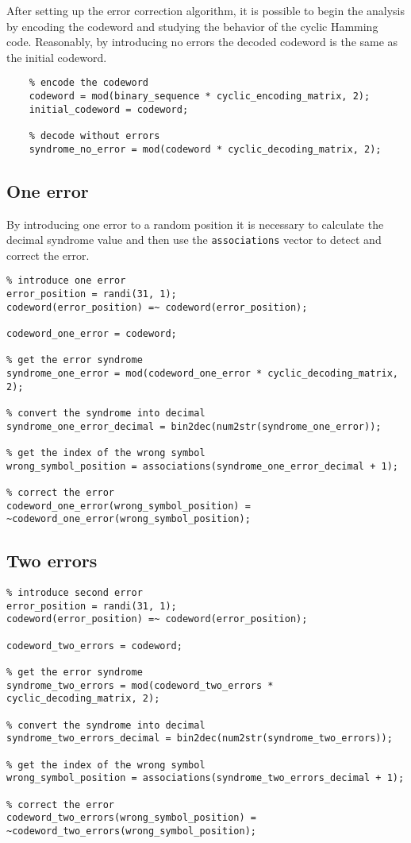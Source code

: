 \noindent After setting up the error correction algorithm, it is possible to begin the analysis by encoding the codeword and studying the behavior of the cyclic Hamming code. Reasonably, by introducing no errors the decoded codeword is the same as the initial codeword.

\begin{lstlisting} 
    % encode the codeword
    codeword = mod(binary_sequence * cyclic_encoding_matrix, 2);
    initial_codeword = codeword;
    
    % decode without errors
    syndrome_no_error = mod(codeword * cyclic_decoding_matrix, 2);
\end{lstlisting}


\subsection{One error}
By introducing one error to a random position it is necessary to calculate the decimal syndrome value and then use the \texttt{associations} vector to detect and correct the error.

\begin{lstlisting}
% introduce one error
error_position = randi(31, 1);
codeword(error_position) =~ codeword(error_position);

codeword_one_error = codeword;

% get the error syndrome
syndrome_one_error = mod(codeword_one_error * cyclic_decoding_matrix, 2);

% convert the syndrome into decimal
syndrome_one_error_decimal = bin2dec(num2str(syndrome_one_error));

% get the index of the wrong symbol
wrong_symbol_position = associations(syndrome_one_error_decimal + 1);

% correct the error
codeword_one_error(wrong_symbol_position) = ~codeword_one_error(wrong_symbol_position);
\end{lstlisting}


\subsection{Two errors} \label{two-errors-correction}

\begin{lstlisting}
% introduce second error
error_position = randi(31, 1);
codeword(error_position) =~ codeword(error_position);

codeword_two_errors = codeword;

% get the error syndrome
syndrome_two_errors = mod(codeword_two_errors * cyclic_decoding_matrix, 2);

% convert the syndrome into decimal
syndrome_two_errors_decimal = bin2dec(num2str(syndrome_two_errors));

% get the index of the wrong symbol
wrong_symbol_position = associations(syndrome_two_errors_decimal + 1);

% correct the error
codeword_two_errors(wrong_symbol_position) = ~codeword_two_errors(wrong_symbol_position);
\end{lstlisting}


